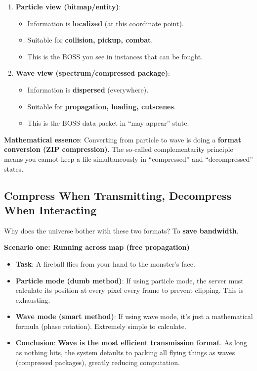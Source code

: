 \begin{enumerate}
\item \textbf{Particle view (bitmap/entity)}:
\begin{itemize}
\item Information is \textbf{localized} (at this coordinate point).
\item Suitable for \textbf{collision, pickup, combat}.
\item This is the BOSS you see in instances that can be fought.
\end{itemize}

\item \textbf{Wave view (spectrum/compressed package)}:
\begin{itemize}
\item Information is \textbf{dispersed} (everywhere).
\item Suitable for \textbf{propagation, loading, cutscenes}.
\item This is the BOSS data packet in ``may appear'' state.
\end{itemize}
\end{enumerate}

\textbf{Mathematical essence}:
Converting from particle to wave is doing a \textbf{format conversion (ZIP compression)}.
The so-called complementarity principle means you cannot keep a file simultaneously in ``compressed'' and ``decompressed'' states.

\subsection{Compress When Transmitting, Decompress When Interacting}

Why does the universe bother with these two formats? To \textbf{save bandwidth}.

\textbf{Scenario one: Running across map (free propagation)}
\begin{itemize}
\item \textbf{Task}: A fireball flies from your hand to the monster's face.
\item \textbf{Particle mode (dumb method)}: If using particle mode, the server must calculate its position at every pixel every frame to prevent clipping. This is exhausting.
\item \textbf{Wave mode (smart method)}: If using wave mode, it's just a mathematical formula (phase rotation). Extremely simple to calculate.
\item \textbf{Conclusion}: \textbf{Wave is the most efficient transmission format}. As long as nothing hits, the system defaults to packing all flying things as waves (compressed packages), greatly reducing computation.
\end{itemize}

